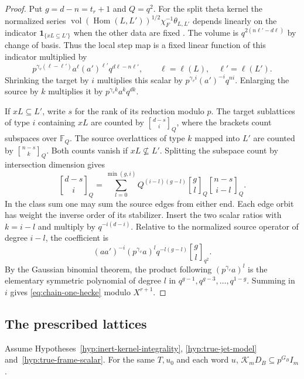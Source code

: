\begin{proof}
Put $g=d-n=t_r+1$ and $Q=q^2$. For the split theta kernel the normalized
series $\operatorname{vol}(\operatorname{Hom}(L,L'))^{1/2}
\chi_F^{-1}\theta_{L,L'}$ depends linearly on the indicator
$\mathbf1_{\{xL\subseteq L'\}}$ when the other data are fixed
\citep[Proposition~11.20]{adriazola-grh}. The volume is
$q^{2(n\ell'-d\ell)}$ by change of basis. Thus the local step map is
a fixed linear function of this indicator multiplied by
\[
      p^{\gamma_v(\ell-\ell')}a^\ell(a')^{\ell'}q^{d\ell-n\ell'},
      \qquad \ell=\ell(L),\quad \ell'=\ell(L').
\]
Shrinking the target by $i$ multiplies this scalar by
$p^{\gamma_vi}(a')^{-i}q^{ni}$. Enlarging the source by $k$ multiplies
it by $p^{\gamma_vk}a^kq^{dk}$.

If $xL\subseteq L'$, write $s$ for the rank of its reduction modulo
$p$. The target sublattices of type $i$ containing $xL$ are counted by
$\genfrac{[}{]}{0pt}{}{d-s}{i}_Q$, where the brackets count subspaces
over $\mathbb F_Q$. The source overlattices of type $k$ mapped into $L'$
are counted by $\genfrac{[}{]}{0pt}{}{n-s}{k}_Q$. Both counts vanish
if $xL\not\subseteq L'$. Splitting the subspace count by intersection
dimension gives
\[
 \genfrac{[}{]}{0pt}{}{d-s}{i}_Q=\sum_{l=0}^{\min(g,i)}
 Q^{(i-l)(g-l)}\genfrac{[}{]}{0pt}{}{g}{l}_Q
 \genfrac{[}{]}{0pt}{}{n-s}{i-l}_Q .
\]
In the class sum one may sum the source edges from either end. Each
edge orbit has weight the inverse order of its stabilizer.
Insert the two scalar ratios with $k=i-l$ and multiply by
$q^{-i(d-i)}$. Relative to the normalized source operator of degree
$i-l$, the coefficient is
\[
 (aa')^{-i}(p^{\gamma_v}a)^l
 q^{-l(g-l)}\genfrac{[}{]}{0pt}{}{g}{l}_{q^2}.
\]
By the Gaussian binomial theorem, the product following
$(p^{\gamma_v}a)^l$ is the elementary symmetric polynomial of degree
$l$ in $q^{g-1},q^{g-3},\ldots,q^{1-g}$. Summing in $i$ gives
\eqref{eq:chain-one-hecke} modulo $X^{r+1}$.
\end{proof}

\subsection{The prescribed lattices}

\begin{corollary}\label{cor:true-integral-chain}
Assume Hypotheses~\ref{hyp:inert-kernel-integrality},
\ref{hyp:true-jet-model} and~\ref{hyp:true-frame-scalar}. For the same
$T,u_0$ and each word $u$, $\mathcal K_m D_B\subseteq p^{G_B}I_m$.
\end{corollary}

